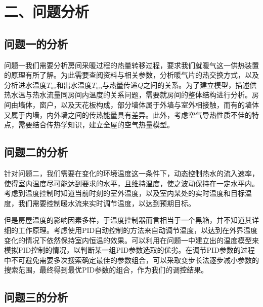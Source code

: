 \documentclass{my_paper}
\begin{document}
\section{二、问题分析}
\subsection{问题一的分析}

问题一我们需要分析房间采暖过程的热量转移过程，要求我们就暖气这一供热装置的原理有所了解。为此需要查阅资料与相关参数，分析暖气片的热交换方式，以及分析进水温度$T_{wi}$和出水温度$ T_{wo} $与热量传递$Q$之间的关系。为了建立模型，描述供热水温与热水流量同房间内温度的关系问题，需要就房间的整体结构进行分析。房间由墙体，窗户，以及天花板构成，部分墙体属于外墙与室外相接触，而有的墙体又属于内墙，内外墙之间的传热能量具有差异。此外，考虑空气导热性质不佳的特点，需要结合传热学知识，建立全屋的空气热量模型。

\subsection{问题二的分析}

针对问题二，我们需要在变化的环境温度这一条件下，动态控制热水的流入速率，使得室内温度尽可能达到要求的水平，且维持温度，使之波动保持在一定水平内。考虑到温度控制时知道当前时刻的室外温度，以及室内某处的实时温度和目标温度，我们需要控制暖水流来实时调节温度，以达到预期目标。

但是房屋温度的影响因素多样，于温度控制器而言相当于一个黑箱，并不知道其详细的工作原理。考虑使用PID自动控制的方法来自动调节温度，以达到在外界温度变化的情况下依然保持室内恒温的效果。可以利用在问题一中建立出的温度模型来模拟PID控制的情况，以判断某一组PID参数选取的优劣。在调节PID参数的过程中不可避免需要多次搜索确定最佳的参数组合，可以采取变步长法逐步减小参数的搜索范围，最终得到最优PID参数的组合，作为我们的调控结果。

\subsection{问题三的分析}


\end{document}
